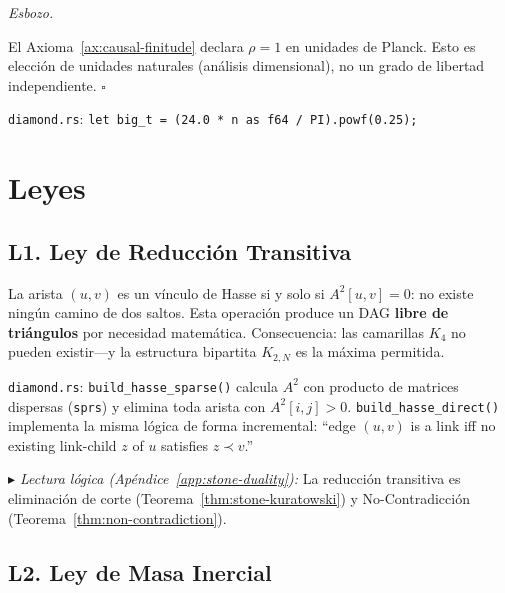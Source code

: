 \documentclass[11pt, a4paper, openany]{book}
\newcommand{\stoneref}[1]{%
  \smallskip\noindent
  {\small\color{structure!70}\textit{$\blacktriangleright$ Lectura
  l\'ogica (Ap\'endice~\ref{app:stone-duality}):} #1}%
  \smallskip}
\renewenvironment{proof}[1][Demostraci\'on]{%
  \par\noindent\textit{#1.}\quad
}{\hfill$\square$\par\medskip}
\begin{document}
\begin{proof}[Esbozo]
El Axioma~\ref{ax:causal-finitude} declara $\rho = 1$ en unidades de
Planck. Esto es elecci\'on de unidades naturales (an\'alisis
dimensional), no un grado de libertad independiente.
\end{proof}

\medskip\noindent
\texttt{diamond.rs}: \texttt{let big\_t =
(24.0 * n as f64 / PI).powf(0.25);}

\section{Leyes}

\subsection*{L1. Ley de Reducci\'on Transitiva}
\label{law:transitive-reduction}

La arista $(u,v)$ es un v\'inculo de Hasse si y solo si
$A^2[u,v] = 0$: no existe ning\'un camino de dos saltos. Esta
operaci\'on produce un DAG \textbf{libre de tri\'angulos} por
necesidad matem\'atica. Consecuencia: las camarillas $K_4$ no
pueden existir---y la estructura bipartita $K_{2,N}$ es la
m\'axima permitida.

\medskip\noindent
\texttt{diamond.rs}: \texttt{build\_hasse\_sparse()} calcula
$A^2$ con producto de matrices dispersas (\texttt{sprs}) y
elimina toda arista con $A^2[i,j] > 0$.
\texttt{build\_hasse\_direct()} implementa la misma l\'ogica de
forma incremental: ``edge $(u,v)$ is a link iff no existing
link-child $z$ of $u$ satisfies $z \prec v$.''

\stoneref{La reducci\'on transitiva es eliminaci\'on de corte
(Teorema~\ref{thm:stone-kuratowski}) y No-Contradicci\'on
(Teorema~\ref{thm:non-contradiction}).}

\subsection*{L2. Ley de Masa Inercial}
\label{law:topological-mass}
\end{document}

